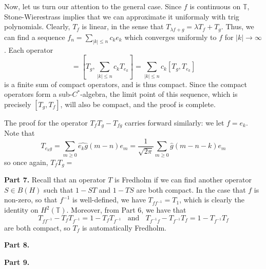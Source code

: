 \documentclass[aps,pra,showpacs,notitlepage,onecolumn,superscriptaddress,nofootinbib]{revtex4-1}
\theoremstyle{definition}
\begin{document}
\noindent Now, let us turn our attention to the general case. Since $f$ is continuous on $\mathbb{T}$, Stone-Wierestrass implies that we can approximate it uniformaly with trig polynomials. Clearly, $T_f$ is linear, in the sense
that $T_{\lambda f + g} = \lambda T_f + T_g$. Thus, we can find a sequence $f_n = \sum_{|k| \leq n} c_k e_k$ which converges uniformly to $f$ for $|k| \to \infty$. Each operator
\begin{equation}
  [T_g, T_{f_n}] = \left[ T_g, \sum_{|k| \leq n} c_k T_{e_k} \right] = \sum_{|k| \leq n} c_k [T_g, T_{e_k}]
\end{equation}
is a finite sum of compact operators, and is thus compact. Since the compact operators form a sub-$C^{*}$-algebra, the limit point of this sequence, which is precisely $[T_g, T_f]$, will also
be compact, and the proof is complete.
\newline

\noindent The proof for the operator $T_f T_g - T_{fg}$ carries forward similarly: we let $f = e_k$. Note that
\begin{equation}
  T_{e_k g} = \displaystyle\sum_{m \geq 0} \widehat{e_k g}(m - n) e_m = \frac{1}{\sqrt{2\pi}} \displaystyle\sum_{m \geq 0} \widehat{g}(m - n - k) e_m
\end{equation}
so once again, $T_{f} T_g = $
\newline

\noindent \textbf{Part 7.} Recall that an operator $T$ is Fredholm if we can find another operator $S \in B(H)$ such that $1 - ST$ and $1 - TS$ are both compact.
In the case that $f$ is non-zero, so that $f^{-1}$ is well-defined, we have $T_{f f^{-1}} = T_1$, which is clearly the identity on $H^2(\mathbb{T})$. Moreover,
from Part 6, we have that
\begin{equation}
  T_{f f^{-1}} - T_{f} T_{f^{-1}} = 1 - T_f T_{f^{-1}} \ \ \ \ \text{and} \ \ \ \ T_{f^{-1} f} - T_{f^{-1}} T_f = 1 - T_{f^{-1}} T_f
\end{equation}
are both compact, so $T_f$ is automatically Fredholm.

\noindent \textbf{Part 8.}

\noindent \textbf{Part 9.}
\end{document}
